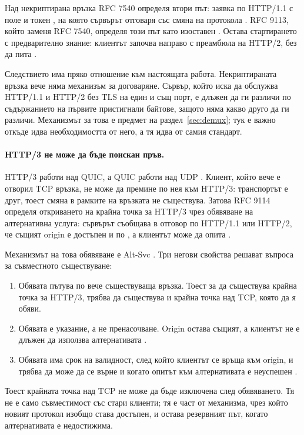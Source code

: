 Над некриптирана връзка RFC 7540 определя втори път: заявка по HTTP/1.1 с поле
 и токен , на която сървърът отговаря със смяна на протокола
\cite{rfc7540}. RFC 9113, който заменя RFC 7540, определя този път като изоставен
\cite{rfc9113}. Остава стартирането с предварително знание: клиентът започва направо с
преамбюла на HTTP/2, без да пита \cite{rfc9113}.

Следствието има пряко отношение към настоящата работа. Некриптираната връзка вече няма
механизъм за договаряне. Сървър, който иска да обслужва HTTP/1.1 и HTTP/2 без TLS на един и
същ порт, е длъжен да ги различи по съдържанието на първите пристигнали байтове, защото няма
какво друго да ги различи. Механизмът за това е предмет на раздел~\ref{sec:demux}; тук е
важно откъде идва необходимостта от него, а тя идва от самия стандарт.

\paragraph{HTTP/3 не може да бъде поискан пръв.} HTTP/3 работи над QUIC, а QUIC работи над UDP
\cite{rfc9114}. Клиент, който вече е отворил TCP връзка, не може да премине по нея към HTTP/3:
транспортът е друг, тоест смяна в рамките на връзката не съществува. Затова RFC 9114 определя
откриването на крайна точка за HTTP/3 чрез обявяване на алтернативна услуга: сървърът съобщава
в отговор по HTTP/1.1 или HTTP/2, че същият origin е достъпен и по , а клиентът може
да опита \cite{rfc9114}.

Механизмът на това обявяване е Alt-Svc \cite{rfc7838}. Три негови свойства решават въпроса за
съвместното съществуване:

\begin{enumerate}[leftmargin=*, nosep]
  \item Обявата пътува по вече съществуваща връзка. Тоест за да съществува крайна точка за
        HTTP/3, трябва да съществува и крайна точка над TCP, която да я обяви.
  \item Обявата е указание, а не пренасочване. Origin остава същият, а клиентът не е длъжен
        да използва алтернативата \cite{rfc7838}.
  \item Обявата има срок на валидност, след който клиентът се връща към origin, и трябва да
        може да се върне и когато опитът към алтернативата е неуспешен \cite{rfc7838}.
\end{enumerate}

Тоест крайната точка над TCP не може да бъде изключена след обявяването. Тя не е само
съвместимост със стари клиенти; тя е част от механизма, чрез който новият протокол изобщо
става достъпен, и остава резервният път, когато алтернативата е недостижима.

